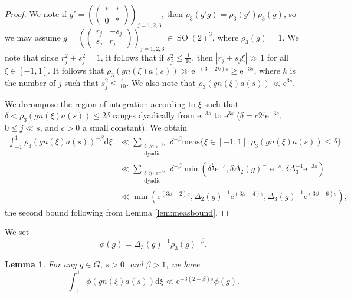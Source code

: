 \documentclass[12pt]{amsart}
\newtheorem{lem}[thm]{Lemma}
\theoremstyle{definition}
\theoremstyle{remark}
\numberwithin{equation}{section}
\newcommand{\dd}{\mathrm{d}}
\newcommand{\e}{\mathrm{e}}
\newcommand{\SO}{\operatorname{SO}}
\begin{document}
\begin{proof}
  We note if $g' = \left(
  \begin{pmatrix}
    * & * \\
    0 & * 
  \end{pmatrix}\right)_{\!\! j=1,2,3}$, then $\rho_3(g'g) = \rho_3(g')\rho_3(g)$, so we may assume $g =
  \left(
  \begin{pmatrix}
    r_j & -s_j \\
    s_j & r_j
  \end{pmatrix}\right)_{\!\! j=1,2,3}
  \in \SO(2)^3$, where $\rho_3(g) = 1$.
  We note that since $r_j^2 + s_j^2 = 1$, it follows that if $s_j^2 \leq \tfrac{1}{10}$, then $|r_j + s_j \xi| \gg 1$ for all $\xi \in [-1,1]$.
  It follows that $\rho_3(gn(\xi)a(s)) \gg \e^{-(3 - 2k)s} \geq \e^{-3s}$, where $k$ is the number of $j$ such that $s_j^2 \leq \tfrac{1}{10}$.
  We also note that $\rho_3(gn(\xi)a(s)) \ll \e^{3s}$. 

  We decompose the region of integration according to $\xi$ such that $\delta < \rho_3(gn(\xi) a(s)) \leq 2 \delta$ ranges dyadically from $\e^{-3s}$ to $\e^{3s}$ ($\delta = c 2^j \e^{-3s}$, $0 \leq j \ll s$, and $c > 0$ a small constant).
  We obtain
  \begin{equation}
  \begin{split}
    \label{eq:dyadicdecomp}
    \int_{-1}^1 \rho_3 (g n(\xi) a(s))^{-\beta} \dd \xi 
&    \ll \sum_{\substack{ \delta \gg \e^{-3s} \\ \mathrm{dyadic}}} \delta^{-\beta} \mathrm{meas}\{ \xi \in [-1,1]: \rho_3(gn(\xi)a(s)) \leq \delta\} \\
 &   \ll \sum_{\substack{ \delta \gg \e^{-3s} \\ \mathrm{dyadic}}} \delta^{-\beta} \min( \delta^{\frac{1}{3}} \e^{-s}, \delta \Delta_2(g)^{-1} \e^{-s}, \delta \Delta_3^{-1} \e^{-3s}) \\
 &   \ll \min (\e^{(3\beta -2)s}, \Delta_2(g)^{-1} \e^{(3\beta - 4)s}, \Delta_3(g)^{-1} \e^{(3\beta -6)s}),
  \end{split}
  \end{equation}
  the second bound following from Lemma \ref{lem:measbound}.
\end{proof}

We set
\begin{equation}
  \label{eq:phidef}
  \phi(g) = \Delta_3(g)^{-1} \rho_3(g)^{-\beta}.
\end{equation}
\begin{lem}
  \label{lem:phicontraction}
  For any $g \in G$, $s > 0$, and $\beta > 1$, we have
  \begin{equation}
    \label{eq:phicontraction}
    \int_{-1}^1 \phi(gn(\xi)a(s)) \dd \xi \ll \e^{-3 (2-\beta) s} \phi(g).
  \end{equation}
\end{lem}
\end{document}
